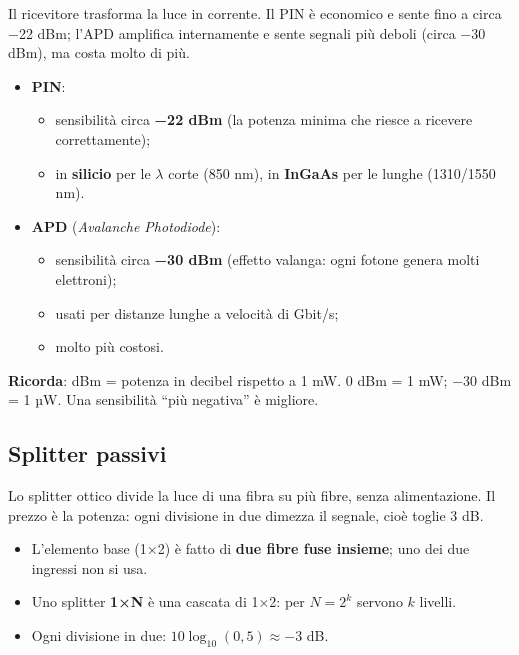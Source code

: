 \begin{inbreve}

Il ricevitore trasforma la luce in corrente. Il PIN è economico e sente fino a circa −22 dBm; l'APD amplifica internamente e sente segnali più deboli (circa −30 dBm), ma costa molto di più.

\end{inbreve}

\begin{itemize}
\tightlist
\item
  \textbf{PIN}:

  \begin{itemize}
  \tightlist
  \item
    sensibilità circa \textbf{−22 dBm} (la potenza minima che riesce a ricevere correttamente);
  \item
    in \textbf{silicio} per le \(\lambda\) corte (850 nm), in \textbf{InGaAs} per le lunghe (1310/1550 nm).
  \end{itemize}
\item
  \textbf{APD} (\emph{Avalanche Photodiode}):

  \begin{itemize}
  \tightlist
  \item
    sensibilità circa \textbf{−30 dBm} (effetto valanga: ogni fotone genera molti elettroni);
  \item
    usati per distanze lunghe a velocità di Gbit/s;
  \item
    molto più costosi.
  \end{itemize}
\end{itemize}

\textbf{Ricorda}: dBm = potenza in decibel rispetto a 1 mW. 0 dBm = 1 mW; −30 dBm = 1 µW. Una sensibilità ``più negativa'' è migliore.

\subsection{Splitter passivi}

\begin{inbreve}

Lo splitter ottico divide la luce di una fibra su più fibre, senza alimentazione. Il prezzo è la potenza: ogni divisione in due dimezza il segnale, cioè toglie 3 dB.

\end{inbreve}

\begin{itemize}
\tightlist
\item
  L'elemento base (1×2) è fatto di \textbf{due fibre fuse insieme}; uno dei due ingressi non si usa.
\item
  Uno splitter \textbf{1×N} è una cascata di 1×2: per \(N = 2^k\) servono \(k\) livelli.
\item
  Ogni divisione in due: \(10 \log_{10}(0{,}5) \approx -3\) dB.
\end{itemize}

